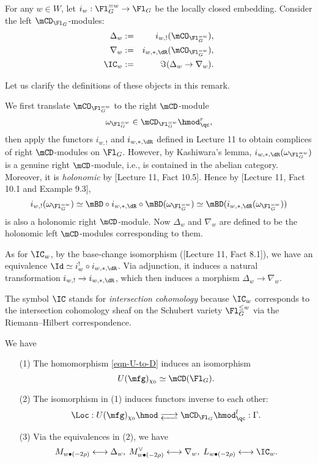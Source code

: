 	\begin{constr}
		For any $w\in W$, let $i_w: \Fl_G^{=w}\to \Fl_G$ be the locally closed embedding. Consider the left $\mCD_{\Fl_G}$-modules:
		\begin{eqnarray*}
			\Delta_w &:=&  i_{w,!}(\mCO_{\Fl_G^{=w}}),\\
			\nabla_w &:=& i_{w,*,\dR}(\mCO_{\Fl_G^{=w}}),\\
			\IC_w &:=& \Im( \Delta_w \to \nabla_w ).
		\end{eqnarray*}
	\end{constr}

	\begin{rem}
		Let us clarify the definitions of these objects in this remark.

		We first translate $\mCO_{\Fl_G^{=w}}$ to the right $\mCD$-module 
		\[
			\omega_{\Fl_G^{=w}} \in \mCD_{\Fl_G^{=w}}\hmod_\qc^r,
		\]
		then apply the functors $i_{w,!}$ and $i_{w,*,\dR}$ defined in Lecture 11 to obtain complices of right $\mCD$-modules on $\Fl_G$. However, by Kashiwara's lemma, $i_{w,*,\dR}(\omega_{\Fl_G^{=w}})$ is a genuine right $\mCD$-module, i.e., is contained in the abelian category. Moreover, it is \emph{holonomic} by [Lecture 11, Fact 10.5]. Hence by [Lecture 11, Fact 10.1 and Example 9.3], 
		\[
			i_{w,!}(\omega_{\Fl_G^{=w}}) \simeq \mBD \circ i_{w,*,\dR} \circ \mBD (\omega_{\Fl_G^{=w}}) \simeq \mBD(i_{w,*,\dR}(\omega_{\Fl_G^{=w}}))
		\]
		is also a holonomic right $\mCD$-module. Now $\Delta_w $ and $\nabla_w $ are defined to be the holonomic left $\mCD$-modules corresponding to them.

		As for $\IC_w$, by the base-change isomorphism ([Lecture 11, Fact 8.1]), we have an equivalence $\Id \simeq i_{w}^! \circ i_{w,*,\dR}$. Via adjunction, it induces a natural transformation $i_{w,!} \to i_{w,*,\dR}$, which then induces a morphism $\Delta_w \to \nabla_w$.
	\end{rem}

	\begin{rem}
		The symbol $\IC$ stands for \emph{intersection cohomology} because $\IC_w$ corresponds to the intersection cohomology sheaf on the Schubert variety $\Fl_G^{\le w}$ via the Riemann--Hilbert correspondence.
	\end{rem}


	\begin{thm}
		\label{thm-localization}
		We have
		\begin{itemize}
			\item[(1)]
				The homomorphism \eqref{eqn-U-to-D} induces an isomorphism
				\[
					U(\mfg)_{\chi_0} \simeq \mCD(\Fl_G).
				\]
			\item[(2)]
				The isomorphism in (1) induces functors inverse to each other:
				\[
					\Loc: U(\mfg)_{\chi_0}\hmod \adj \mCD_{\Fl_G}\hmod_\qc^l : \Gamma.
				\]
			\item[(3)]
				Via the equivalences in (2), we have
				\[
					M_{w\bullet (-2\rho)} \longleftrightarrow \Delta_w,\; M^\vee_{w\bullet (-2\rho)} \longleftrightarrow \nabla_w,\; L_{w\bullet (-2\rho)} \longleftrightarrow \IC_w.
				\]
		\end{itemize}
	\end{thm}

